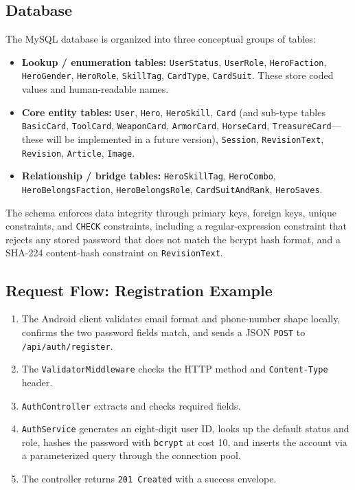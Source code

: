 \subsection{Database}

The MySQL database is organized into three conceptual groups of tables:

\begin{itemize}
  \item \textbf{Lookup / enumeration tables:} \texttt{UserStatus}, \texttt{UserRole}, \texttt{HeroFaction}, \texttt{HeroGender}, \texttt{HeroRole}, \texttt{SkillTag}, \texttt{CardType}, \texttt{CardSuit}. These store coded values and human-readable names.
  \item \textbf{Core entity tables:} \texttt{User}, \texttt{Hero}, \texttt{HeroSkill}, \texttt{Card} (and sub-type tables \texttt{BasicCard}, \texttt{ToolCard}, \texttt{WeaponCard}, \texttt{ArmorCard}, \texttt{HorseCard}, \texttt{TreasureCard}---these will be implemented in a future version), \texttt{Session}, \texttt{RevisionText}, \texttt{Revision}, \texttt{Article}, \texttt{Image}.
  \item \textbf{Relationship / bridge tables:} \texttt{HeroSkillTag}, \texttt{HeroCombo}, \texttt{HeroBelongsFaction}, \texttt{HeroBelongsRole}, \texttt{CardSuitAndRank}, \texttt{HeroSaves}.
\end{itemize}

The schema enforces data integrity through primary keys, foreign keys, unique constraints, and \texttt{CHECK} constraints, including a regular-expression constraint that rejects any stored password that does not match the bcrypt hash format, and a SHA-224 content-hash constraint on \texttt{RevisionText}.

\subsection{Request Flow: Registration Example}

\begin{enumerate}
  \item The Android client validates email format and phone-number shape locally, confirms the two password fields match, and sends a JSON \texttt{POST} to \texttt{/api/auth/register}.
  \item The \texttt{ValidatorMiddleware} checks the HTTP method and \texttt{Content-Type} header.
  \item \texttt{AuthController} extracts and checks required fields.
  \item \texttt{AuthService} generates an eight-digit user ID, looks up the default status and role, hashes the password with \texttt{bcrypt} at cost 10, and inserts the account via a parameterized query through the connection pool.
  \item The controller returns \texttt{201 Created} with a success envelope.
\end{enumerate}

